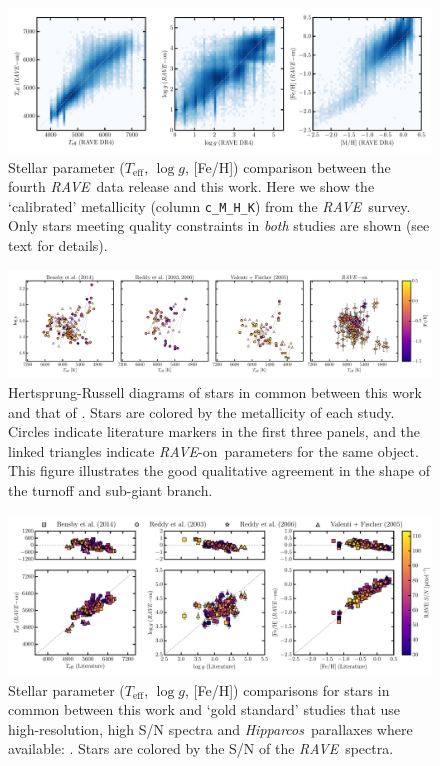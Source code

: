 \documentclass[preprint]{aastex61}
\newcommand{\acronym}[1]{{\small{#1}}}
\newcommand{\project}[1]{\textsl{#1}}
\newcommand{\rave}{\project{\acronym{RAVE}}}
\newcommand{\hipparcos}{\project{Hipparcos}}
\newcommand{\raveon}{\rave-on}
\newcommand{\teff}{T_{\mathrm{eff}}}
\newcommand{\logg}{\log g}
\begin{document}
\begin{figure}[p]
\includegraphics[width=\textwidth]{figures/dr4-comparison.pdf}
\caption{Stellar parameter ($\teff$, $\logg$, [Fe/H]) comparison between the fourth \rave\ data release \citep{Kordopatis_2013} and this work. Here we show the `calibrated' metallicity (column \texttt{c\_M\_H\_K}) from the \rave\ survey. Only stars meeting quality constraints in \emph{both} studies are shown (see text for details).\label{fig:rave-dr4-comparison}}
\end{figure}


\begin{figure}[p]
\includegraphics[width=\textwidth]{figures/gold-standard-hrd.pdf}
\caption{Hertsprung-Russell diagrams of stars in common between this work and that of \citet{Bensby_2014,Reddy_2003,Reddy_2006,Valenti_Fischer_2005}.  Stars are colored by the metallicity of each study. Circles indicate literature markers in the first three panels, and the linked triangles indicate \raveon\ parameters for the same object. This figure illustrates the good qualitative agreement in the shape of the turnoff and sub-giant branch.\label{fig:gold-standard-hrd}}
\end{figure}


\begin{figure}[p]
\includegraphics[width=\textwidth]{figures/gold-standard-comparison.pdf}
\caption{Stellar parameter ($\teff$, $\logg$, [Fe/H]) comparisons for stars in common between this work and `gold standard' studies that use high-resolution, high S/N spectra and \hipparcos\ parallaxes where available: \citet{Bensby_2014,Reddy_2003,Reddy_2006,Valenti_Fischer_2005}. Stars are colored by the S/N of the \rave\ spectra. \label{fig:gold-standard-comparison}}
\end{figure}
\end{document}
